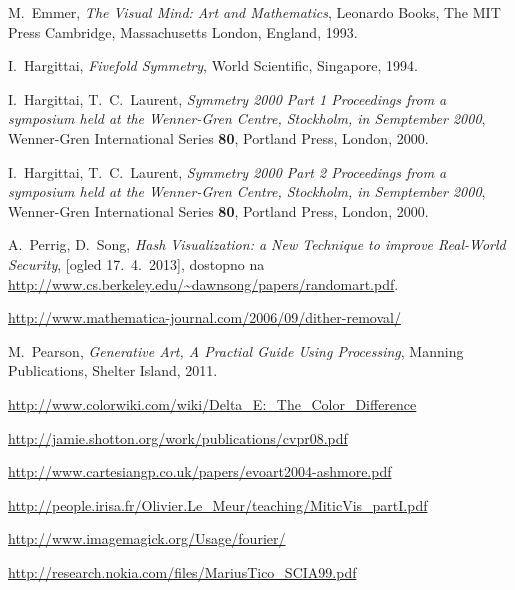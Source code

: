 M.~Emmer, \emph{The Visual Mind: Art and Mathematics}, Leonardo Books, The MIT Press Cambridge, Massachusetts London, England, 1993.

I.~Hargittai, \emph{Fivefold Symmetry}, World Scientific, Singapore, 1994.

I.~Hargittai, T.~C.~Laurent, \emph{Symmetry 2000 Part 1 Proceedings from a symposium held at the Wenner-Gren Centre, Stockholm, in Semptember 2000}, Wenner-Gren International Series {\bf 80}, Portland Press, London, 2000.

I.~Hargittai, T.~C.~Laurent, \emph{Symmetry 2000 Part 2 Proceedings from a symposium held at the Wenner-Gren Centre, Stockholm, in Semptember 2000}, Wenner-Gren International Series {\bf 80}, Portland Press, London, 2000.

A.~Perrig, D.~Song, \emph{Hash Visualization: a New Technique to improve Real-World Security}, [ogled 17.~4.~2013], dostopno na \url{http://www.cs.berkeley.edu/~dawnsong/papers/randomart.pdf}.

\url{http://www.mathematica-journal.com/2006/09/dither-removal/}

M.~Pearson, \emph{Generative Art, A Practial Guide Using Processing}, Manning Publications, Shelter Island, 2011.

\url{http://www.colorwiki.com/wiki/Delta_E:_The_Color_Difference}

\url{http://jamie.shotton.org/work/publications/cvpr08.pdf}

\url{http://www.cartesiangp.co.uk/papers/evoart2004-ashmore.pdf}

\url{http://people.irisa.fr/Olivier.Le_Meur/teaching/MiticVis_partI.pdf}

\url{http://www.imagemagick.org/Usage/fourier/}

\url{http://research.nokia.com/files/MariusTico_SCIA99.pdf}